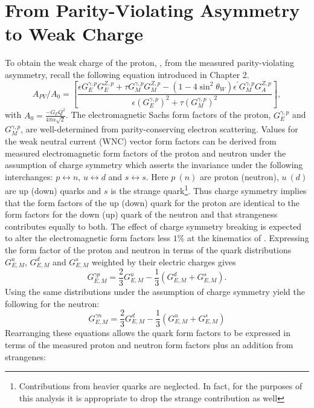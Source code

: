\section{\label{Sctn:qwpExtract}From Parity-Violating Asymmetry to Weak Charge}
To obtain the weak charge of the proton, \qwp, from the measured parity-violating asymmetry, recall the following equation introduced in Chapter 2.
\begin{equation}
A_{PV}/A_0=\left[\frac{{\epsilon}G^{\gamma,p}_EG^{Z,p}_E+{\tau}G^{\gamma,p}_MG^{Z,p}_M-\left(1-4\sin^2{\theta}_W\right){\epsilon}^{\prime}G^{\gamma,p}_MG^{Z,p}_A}{{\epsilon}(G^{\gamma,p}_E)^2+{\tau}(G^{\gamma,p}_M)^2} \right],
\label{eq:qw_asymmetry2}
\end{equation} 
with $A_0=\frac{-G_FQ^2}{4\pi \alpha\sqrt{2}}$.
The electromagnetic Sachs form factors of the proton, $G^{\gamma,p}_E$ and $G^{\gamma,p}_M$, are well-determined from parity-conserving electron scattering. Values for the weak neutral current (WNC) vector form factors can be derived from measured electromagnetic form factors of the proton and neutron under the assumption of charge symmetry which asserts the invariance under the following interchanges: $p\leftrightarrow n$, $u\leftrightarrow d$ and $s\leftrightarrow s$. Here $p~(n)$ are proton (neutron), $u~(d)$ are up (down) quarks and $s$ is the strange quark\footnote{Contributions from heavier quarks are neglected. In fact, for the purposes of this analysis it is appropriate to drop the strange contribution as well}. Thus charge symmetry implies that the form factors of the up (down) quark for the proton are identical to the form factors for the down (up) quark of the neutron and that strangeness contributes equally to both. The effect of charge symmetry breaking is expected to alter the electromagnetic form factors less $1\%$ at the kinematics of \Q\cite{Miller2014}. Expressing the form factor of the proton and neutron in terms of the quark distributions $G_{E,M}^u$, $G_{E,M}^d$ and $G_{E,M}^s$ weighted by their electric charges gives 
\begin{equation}
G_{E,M}^{\gamma p}=\frac{2}{3}G_{E,M}^{u}-\frac{1}{3}(G_{E,M}^{d}+G_{E,M}^{s}).
\label{eq:gemp}
\end{equation}
Using the same distributions under the assumption of charge symmetry yield the following for the neutron:
\begin{equation}
G_{E,M}^{\gamma n}=\frac{2}{3}G_{E,M}^{d}-\frac{1}{3}(G_{E,M}^{u}+G_{E,M}^{s})
\label{eq:gemn}
\end{equation}
Rearranging these equations allows the quark form factors to be expressed in terms of the measured proton and neutron form factors plus an addition from strangenes:
